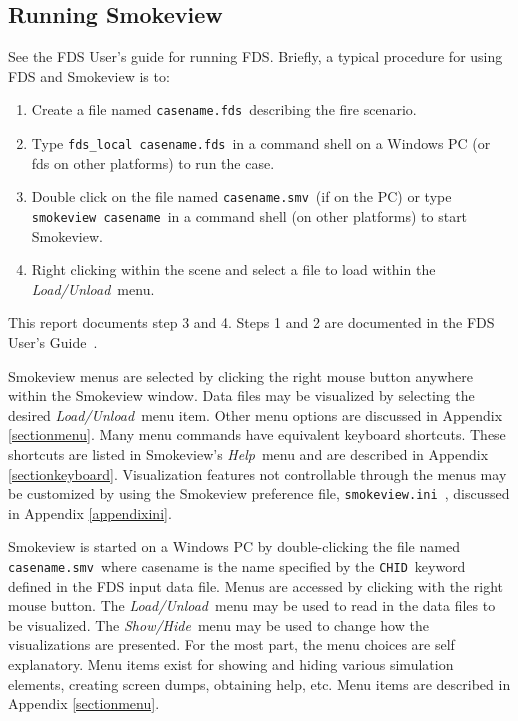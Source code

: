 \documentclass[11pt,twoside]{book}
\newcommand{\svini}{{\tt smokeview.ini}\ }
\begin{document}

\subsection{Running Smokeview}

See the FDS User's guide for running FDS\cite{FDS_Users_Guide}.  Briefly, a typical procedure for using FDS and Smokeview is to:
\begin{enumerate}

\item Create a file named {\tt casename.fds}\ describing the fire
scenario.

\item Type {\tt fds\_local~casename.fds}\ in a command shell on a Windows PC (or fds on other platforms) to run the
case.

\item Double click on the file named {\tt casename.smv}\ (if on the
PC) or type {\tt smokeview~casename}\ in a command shell (on other
platforms) to start Smokeview.

\item Right clicking within the scene and select a file to load
within the {\em Load/Unload}\ menu.
\end{enumerate}

\noindent This report documents step 3 and 4. Steps 1 and 2 are
documented in the FDS User's Guide~\cite{FDS_Users_Guide}.

Smokeview menus are selected by clicking the right mouse
button anywhere within the Smokeview window.  Data files may be
visualized by selecting the desired {\em Load/Unload}\ menu item.
Other menu options are discussed in Appendix
\ref{sectionmenu}. Many menu commands have equivalent keyboard
shortcuts. These shortcuts are listed in Smokeview's {\em Help}\
menu and are described in Appendix \ref{sectionkeyboard}.
Visualization features not controllable through the menus may be
customized by using the Smokeview preference file, \svini,
discussed in Appendix \ref{appendixini}.

Smokeview  is started on a Windows PC by double-clicking the file
named {\tt casename.smv}\ where casename is the name specified by
the {\tt CHID}\ keyword defined in the FDS input data file. Menus
are accessed by clicking with the right mouse button.  The {\em
Load/Unload}\ menu may be used to read in the data files to be
visualized. The {\em Show/Hide}\ menu may be used to change how
the visualizations are presented. For the most part, the menu
choices are self explanatory. Menu items exist for showing and
hiding various simulation elements, creating screen dumps,
obtaining help, etc. Menu items are described in Appendix
\ref{sectionmenu}.
\end{document}
